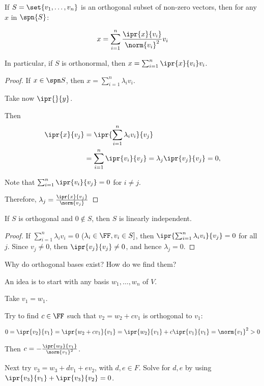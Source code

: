\documentclass[11pt]{scrartcl}
\begin{document}
\begin{theorem}
  \label{sec:gram-schm-orth}
  If $S = \set{v_1,\dots,v_n}$ is an orthogonal subset of non-zero
  vectors, then for any $x$ in $ \spn{S}$:

  \begin{equation*}
x = \sum_{i=1}^n \frac{\ipr{x}{v_{i}}}{\norm{v_i}^{2}}v_{i}
  \end{equation*}

  In particular, if $S$ is orthonormal, then $x = \sum_{i=1}^{n}\ipr{x}{v_i}v_i$.
\end{theorem}
\begin{proof}
  If $x\in \spn S$, then $ x = \sum_{i=1}^n\lambda_iv_i $.

  Take now $\ipr{\*}{y}$.

  Then
  \begin{align}
    \ipr{x}{v_j} &= \ipr{\sum_{i=1}^{n}\lambda_iv_{i}}{v_{j}}\\
    &=\sum_{i=1}^n\ipr{v_i}{v_j} = \lambda_{j}\ipr{v_j}{v_j} = 0,
  \end{align}

  Note that $\sum_{i=1}^n\ipr{v_i}{v_j} = 0$ for  $i \neq j$.

  Therefore, $\lambda_j = \frac{\ipr{x}{v_j}}{\norm{v_{j}}}$
\end{proof}

\begin{corollary}
If $S$ is orthogonal and $0\not\in S$, then $S$ is linearly independent.
\end{corollary}

\begin{proof}
  If $\sum_{i=1}^n\lambda_{i}v_i = 0$ ($\lambda_i\in \FF, v_i\in S ]$,
  then $\ipr{\sum_{i=1}^n\lambda_{i}v_i }{v_{j}} = 0$ for all
  $j$. Since $v_j\neq 0$, then $\ipr{v_j}{v_{j}} \neq 0$, and hence
  $\lambda_j = 0$.
\end{proof}
\begin{ques*}
Why do orthogonal bases exist? How do we find them?
\end{ques*}

\begin{answer*}

  An idea is to start with any basis $w_1, \dots, w_n$ of $V$.

  Take $v_1=w_1$.

  Try to find $c\in \FF$ such that $v_2= w_2+cv_1$ is orthogonal to $v_1$:

  \begin{align}
    0 = \ipr{v_2}{v_1} = \ipr{w_2+cv_1}{v_1} = \ipr{w_2}{v_1} + c\ipr{v_1}{v_{1}}  =  \norm{v_1}^2>0
  \end{align}

  Then $c = - \frac{\ipr{w_2}{v_1}}{\norm{v_1}^{2}}$.

  Next try $v_{3} = w_3+dv_1+ev_2$, with $d, e \in F$. Solve for $d,e$
  by using $\ipr{v_3}{v_1}+\ipr{v_3}{v_2} = 0$.

\end{answer*}
\end{document}
